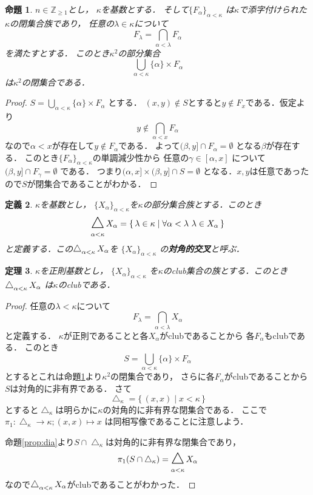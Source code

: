 \documentclass[leqno]{jsarticle}
\newtheorem{thm}{定理}
\newtheorem{prop}[thm]{命題}
\newtheorem{df}[thm]{定義}
\newcommand{\zz}{\mathbb{Z}}
\newcommand{\al}{\alpha}
\newcommand{\be}{\beta}
\newcommand{\la}{\lambda}
\DeclareMathOperator*{\dic}{\scalerel*{\bigtriangleup}{\sum}}
\begin{document}
\begin{prop}\label{prop:close}
$n\in \zz_{\ge 1}$とし，
$\kappa$を基数とする．
そして$\{F_{\alpha}\}_{\alpha<\kappa}$
は$\kappa$で添字付けられた$\kappa$の閉集合族であり，
任意の$\la\in \kappa$について
\[
F_{\la}=\bigcap_{\alpha<\la}F_{\alpha}
\]
を満たすとする．
このとき$\kappa^2$の部分集合
\[
\bigcup_{\alpha<\kappa}\{\alpha\}\times F_{\alpha}
\]
は$\kappa^2$の閉集合である．
\end{prop}
\begin{proof}
$S=\bigcup_{\alpha<\kappa}\{\alpha\}\times F_{\alpha}$
とする．
$(x, y)\not\in S$とすると$y\not\in F_x$である．仮定より
\[
y\not\in \bigcap_{\alpha<x}F_{\alpha}
\]
なので$\alpha<x$が存在して$y\not\in F_{\alpha}$である．
よって$(\be, y]\cap F_{\alpha}=\emptyset$
となる$\be$が存在する．
このとき$\{F_{\alpha}\}_{\alpha<\kappa}$の単調減少性から
任意の$\gamma\in [\alpha, x]$
について
$(\be, y]\cap F_{\gamma}=\emptyset$
である．
つまり$(\alpha, x]\times (\be, y]\cap S=\emptyset$
となる．$x, y$は任意であったので$S$が閉集合であることがわかる．
\end{proof}

\begin{df}
$\kappa$を基数とし，
$\{X_{\alpha}\}_{\al<\kappa}$を$\kappa$の部分集合族とする．このとき
\[
\dic_{\al<\kappa}X_{\al}=\{\, \la\in \kappa\mid \forall \al<\la\ \la\in X_{\al}\, \}
\]
と定義する．この$\dic_{\al<\kappa}X_{\al}$を
$\{X_{\al}\}_{\al<\kappa}$
の\textbf{対角的交叉}と呼ぶ．
\end{df}

\begin{thm}\label{thm:dic}
$\kappa$を正則基数とし，
$\{X_{\al}\}_{\al<\kappa}$
を$\kappa$のclub集合の族とする．このとき
$\dic_{\al<\kappa}X_{\al}$
は$\kappa$のclubである．
\end{thm}
\begin{proof}
任意の$\la <\kappa$について
\[
F_{\la}=\bigcap_{\al<\la}X_{\al}
\]
と定義する．
$\kappa$が正則であることと各$X_{\al}$がclubであることから
各$F_{\al}$もclubである．
このとき
\[
S=\bigcup_{\al<\kappa}\{\al\}\times F_{\al}
\]
とするとこれは命題\ref{prop:close}より$\kappa^2$の閉集合であり，
さらに各$F_{\al}$がclubであることから$S$は対角的に非有界である．
さて
\[
\bigtriangleup_{\kappa}=\{\, (x, x)\mid x<\kappa\, \}
\]
とすると$\bigtriangleup_{\kappa}$は明らかに$\kappa$の対角的に非有界な閉集合である．
ここで$\pi_1: \bigtriangleup_{\kappa}\to \kappa; (x, x)\mapsto x$
は同相写像であることに注意しよう．

命題\ref{prop:dia}より$S\cap \bigtriangleup_{\kappa}$は対角的に非有界な閉集合であり，
\[
\pi_{1}(S\cap \bigtriangleup_{\kappa})=\dic_{\al<\kappa}X_{\al}
\]
なので$\dic_{\al<\kappa}X_{\al}$がclubであることがわかった．

\end{proof}
\end{document}
